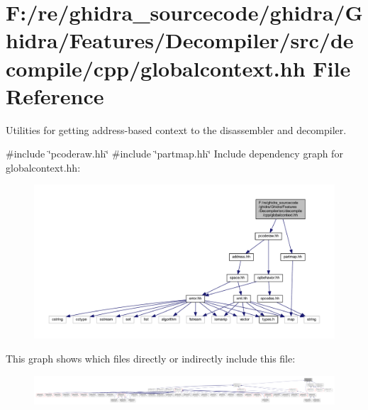 \hypertarget{globalcontext_8hh}{}\section{F\+:/re/ghidra\+\_\+sourcecode/ghidra/\+Ghidra/\+Features/\+Decompiler/src/decompile/cpp/globalcontext.hh File Reference}
\label{globalcontext_8hh}


Utilities for getting address-\/based context to the disassembler and decompiler.  


{\ttfamily \#include \char`\"{}pcoderaw.\+hh\char`\"{}}\newline
{\ttfamily \#include \char`\"{}partmap.\+hh\char`\"{}}\newline
Include dependency graph for globalcontext.\+hh\+:
\nopagebreak
\begin{figure}[H]
\begin{center}
\leavevmode
\includegraphics[width=350pt]{globalcontext_8hh__incl}
\end{center}
\end{figure}
This graph shows which files directly or indirectly include this file\+:
\nopagebreak
\begin{figure}[H]
\begin{center}
\leavevmode
\includegraphics[width=350pt]{globalcontext_8hh__dep__incl}
\end{center}
\end{figure}
